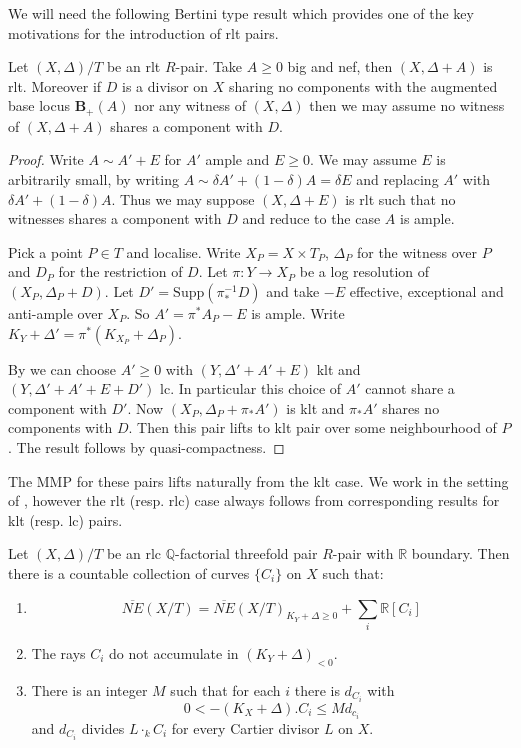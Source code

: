 \documentclass[a4paper,12pt]{amsart}
\newcommand{\BS}{\mathbf{B}_{+}}
\begin{document}
	We will need the following Bertini type result which provides one of the key motivations for the introduction of rlt pairs.
	
	\begin{lemma}\label{bertini}
		Let $(X,\Delta)/T$ be an rlt $R$-pair. Take $A\geq 0$ big and nef, then $(X,\Delta+A)$ is rlt. Moreover if $D$ is a divisor on $X$ sharing no components with the augmented base locus $\BS(A)$ nor any witness of $(X,\Delta)$ then we may assume no witness of $(X,\Delta+A)$ shares a component with $D$.
	\end{lemma}
	\begin{proof}
		Write $A \sim A'+E$ for $A'$ ample and $E \geq 0$. We may assume $E$ is arbitrarily small, by writing $A\sim \delta A' + (1-\delta)A=\delta E$ and replacing $A'$ with $\delta A' + (1-\delta)A$. Thus we may suppose $(X,\Delta+E)$ is rlt such that no witnesses shares a component with $D$ and reduce to the case $A$ is ample.
		
		Pick a point $P \in T$ and localise. Write $X_{P}=X \times T_{P}$, $\Delta_{P}$ for the witness over $P$ and $D_{P}$ for the restriction of $D$. Let $\pi:Y \to X_{P}$ be a log resolution of $(X_{P},\Delta_{P}+D)$. Let $D'=\text{Supp}(\pi^{-1}_{*}D)$ and take $-E$ effective, exceptional and anti-ample over $X_{P}$. So $A'=\pi^{*}A_{P}-E$ is ample. Write $K_{Y}+\Delta'=\pi^{*}(K_{X_{P}}+\Delta_{P})$.
		
		By \cite[Theorem 2.11]{bhatt2020globally+} we can choose $A'\geq 0$ with $(Y,\Delta'+A'+E)$ klt and $(Y,\Delta'+A'+E+D')$ lc. In particular this choice of $A'$ cannot share a component with $D'$. Now $(X_{P},\Delta_{P}+\pi_{*}A')$ is klt and $\pi_{*}A'$ shares no components with $D$. Then this pair lifts to klt pair over some neighbourhood of $P$. The result follows by quasi-compactness.
	\end{proof}

	The MMP for these pairs lifts naturally from the klt case. We work in the setting of \cite{bhatt2020}, however the rlt (resp. rlc) case always follows from corresponding results for klt (resp. lc) pairs.
	
	
	\begin{theorem}
		Let $(X,\Delta)/T$ be an rlc $\mathbb{Q}$-factorial threefold pair $R$-pair with $\mathbb{R}$ boundary.	Then there is a countable collection of curves $\{C_{i}\}$ on $X$ such that:
		\begin{enumerate}
			\item $$\overline{NE}(X/T)=\overline{NE}(X/T)_{K_{Y}+\Delta \geq 0} + \sum_{i} \mathbb{R}[C_{i}]$$
			\item The rays $C_{i}$ do not accumulate in $(K_{Y}+\Delta)_{<0}$.
			\item There is an integer $M$ such that for each $i$ there is $d_{C_{i}}$ with 
			\[0 < -(K_{X}+\Delta).C_{i} \leq Md_{c_{i}}\]
			and $d_{C_{i}}$ divides $L\cdot_{k}C_{i}$ for every Cartier divisor $L$ on $X$.
		\end{enumerate}
	\end{theorem}
	
\end{document}
